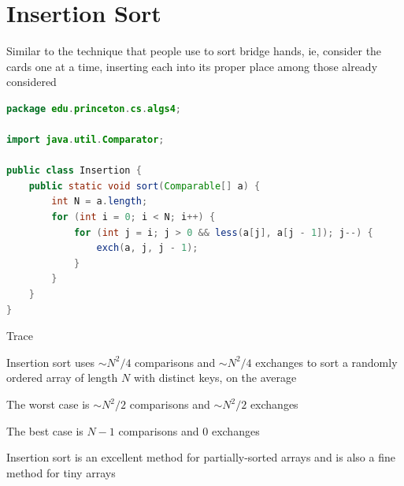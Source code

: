 \documentclass[8pt,a4paper,compress]{beamer}
\begin{document}
\section{Insertion Sort}
\begin{frame}[fragile]
\pause

Similar to the technique that people use to sort bridge hands, ie, consider the cards one at a time, inserting each into its proper place among those already considered

\pause
\bigskip

\begin{lstlisting}[language=Java]
package edu.princeton.cs.algs4;

import java.util.Comparator;

public class Insertion {
    public static void sort(Comparable[] a) {
        int N = a.length;
        for (int i = 0; i < N; i++) {
            for (int j = i; j > 0 && less(a[j], a[j - 1]); j--) {
                exch(a, j, j - 1);
            }
        }
    }
}
\end{lstlisting}
\end{frame}

\begin{frame}[fragile]
\pause

Trace
\begin{center}
\end{center}
\end{frame}

\begin{frame}[fragile]
\pause

Insertion sort uses $\sim N^2 /4$ comparisons and $\sim N^2 /4$ exchanges to sort a randomly ordered array of length $N$ with distinct keys, on the average

\pause
\bigskip

The worst case is $\sim N^2 /2$ comparisons and $\sim N^2/2$ exchanges

\pause
\bigskip

The best case is $N-1$ comparisons and 0 exchanges

\pause
\bigskip

Insertion sort is an excellent method for partially-sorted arrays and is also a fine method for tiny arrays
\end{frame}
\end{document}
